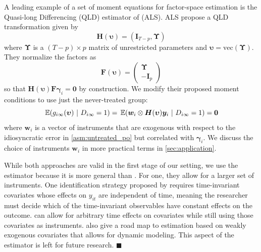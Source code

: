 \documentclass[12pt]{article}
\newcommand{\kyle}[1]{\coauthorComment[Kyle]{#1}}
\begin{document}
\begin{remark}\label{remark:QLD}
A leading example of a set of moment equations for factor-space estimation is the Quasi-long Differencing (QLD) estimator of \citet{Ahn_Lee_Schmidt_2013} (ALS). ALS propose a QLD transformation given by 
\begin{equation}
  \bm H(\bm \upsilon) = (\bm I_{T-p}, \bm \Upsilon)
\end{equation}
where $\bm \Upsilon$ is a $(T-p) \times p$ matrix of unrestricted parameters and $\bm \upsilon = \text{vec}(\bm \Upsilon)$. They normalize the factors as 
\begin{equation}
  \bm{F}(\bm \upsilon) = 
  \begin{pmatrix}
    \bm \Upsilon\\
    -\bm I_p
  \end{pmatrix}
\end{equation}
so that $\bm H(\bm \upsilon) \bm{F} \bm \gamma_i = \bm 0$ by construction. We modify their proposed moment conditions to use just the never-treated group:
\begin{equation}
  \expec{g_{i\infty}(\bm{\upsilon})}{D_{i\infty} = 1} = \expec{\bm w_i \otimes \bm H(\bm \upsilon) \bm y_i}{D_{i\infty} = 1} = \bm 0
\end{equation}
where $\bm w_i$ is a vector of instruments that are exogenous with respect to the idiosyncratic error in \autoref{asm:untreated_po} but correlated with $\bm \gamma_i$. We discuss the choice of instruments $\bm w_i$ in more practical terms in \autoref{sec:application}.

While both approaches are valid in the first stage of our setting, we use the \citet{Ahn_Lee_Schmidt_2013} estimator because it is more general than \citet{Callaway_Karami_2020}. For one, they allow for a larger set of instruments. One identification strategy proposed by \citet{Callaway_Karami_2020} requires time-invariant covariates whose effects on $y_{it}$ are independent of time, meaning the researcher must decide which of the time-invariant observables have constant effects on the outcome. \citet{Ahn_Lee_Schmidt_2013} can allow for arbitrary time effects on covariates while still using those covariates as instruments. \citet{Ahn_Lee_Schmidt_2013} also give a road map to estimation based on weakly exogenous covariates that allows for dynamic modeling. This aspect of the estimator is left for future research.
$\blacksquare$
\end{remark}

\kyle{Discussion of selecting $p$}
\end{document}

